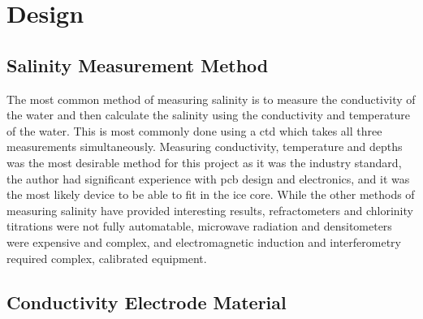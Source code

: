 
\chapter{Design}\label{ch:design}

\section{Salinity Measurement Method}

The most common method of measuring salinity is to measure the conductivity of the water and then calculate the salinity using the conductivity and temperature of the water.
This is most commonly done using a \gls{ctd} which takes all three measurements simultaneously.
Measuring conductivity, temperature and depths was the most desirable method for this project as it was the industry standard, the author had significant experience with \gls{pcb} design and electronics, and it was the most likely device to be able to fit in the ice core.
While the other methods of measuring salinity have provided interesting results, refractometers and chlorinity titrations were not fully automatable, microwave radiation and densitometers were expensive and complex, and electromagnetic induction and interferometry required complex, calibrated equipment.

\section{Conductivity Electrode Material}

